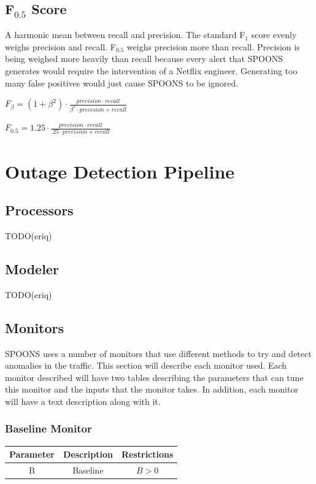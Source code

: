 \documentclass[12pt]{ucthesis}
\begin{document}
\subsection{F$_{0.5}$ Score}
A harmonic mean between recall and precision. The standard F$_{1}$ score evenly weighs precision and recall.
F$_{0.5}$ weighs precision more than recall. Precision is being weighed more heavily than recall because
every alert that SPOONS generates would require the intervention of a Netflix engineer. Generating too many
false positives would just cause SPOONS to be ignored.
\begin{center}
   $F_{\beta} = (1 + \beta^{2}) \cdot \frac{precision \cdot recall}{\beta^{2} \cdot precision + recall}$
\end{center}
\begin{center}
   $F_{0.5} = 1.25 \cdot \frac{precision \cdot recall}{.25 \cdot precision + recall}$
\end{center}

\section{Outage Detection Pipeline}
\label{outage-detection-pipeline}

\subsection{Processors}
\label{outage-detection-processors}
TODO(eriq)

\subsection{Modeler}
\label{outage-detection-modeler}
TODO(eriq)

\subsection{Monitors}
\label{outage-detection-monitors}
SPOONS uses a number of monitors that use different methods to try and detect anomalies in the traffic.
This section will describe each monitor used.
Each monitor described will have two tables describing the parameters that can tune this monitor and
the inputs that the monitor takes. In addition, each monitor will have a text description along with it.

\subsubsection{Baseline Monitor}
\label{outage-detection-monitors-Baseline}
\begin{table}[H]
   \begin{center}
      \begin{tabular}{|c|c|c|}
         \hline
            Parameter & Description & Restrictions \\
         \hline
            B & Baseline & $ B > 0 $\\
         \hline
      \end{tabular}
   \end{center}
\end{table}
\end{document}
